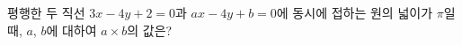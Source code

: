 평행한 두 직선 $3x - 4y + 2 = 0$과 $ax - 4y + b = 0$에 동시에 접하는 원의 넓이가 $\pi$일 때, $a$, $b$에 대하여 $a \times b$의 값은?
